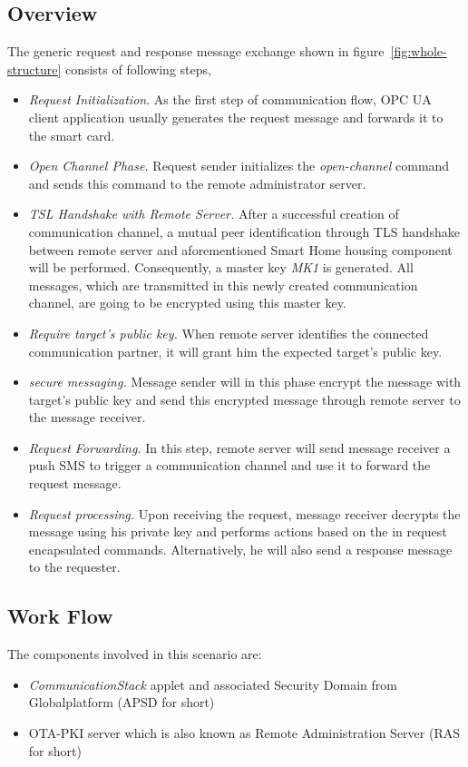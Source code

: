 \subsection{Overview}
The generic request and response message exchange shown in figure~\ref{fig:whole-structure} consists of following steps,
\begin{itemize}
\item \emph{Request Initialization}. As the first step of communication flow, OPC UA client application usually generates the request message and forwards it to the smart card.
\item \emph{Open Channel Phase.} Request sender initializes the \emph{open-channel} command and sends this command to the remote administrator server.
\item \emph{TSL Handshake with Remote Server.} After a successful creation of communication channel, a mutual peer identification through TLS handshake between remote server and aforementioned Smart Home housing component will be performed. Consequently, a master key \emph{MK1} is generated. All messages, which are transmitted in this newly created communication channel, are going to be encrypted using this master key.
\item \emph{Require target's public key.} When remote server identifies the connected communication partner, it will grant him the expected target's public key. 
\item \emph{secure messaging.} Message sender will in this phase encrypt the message with target's public key and send this encrypted message through remote server to the message receiver.
\item \emph{Request Forwarding.} In this step, remote server will send message receiver a push SMS to trigger a communication channel and use it to forward the request message.
\item \emph{Request processing.} Upon receiving the request, message receiver decrypts the message using his private key and performs actions based on the in request encapsulated commands. Alternatively, he will also send a response message to the requester.
\end{itemize}
\subsection {Work Flow}

The components involved in this scenario are:
 \begin{itemize}
  \item \emph{CommunicationStack} applet and associated Security Domain from Globalplatform (APSD  for short)
  \item OTA-PKI server which is also known as Remote Administration Server (RAS for short)
\end{itemize}

